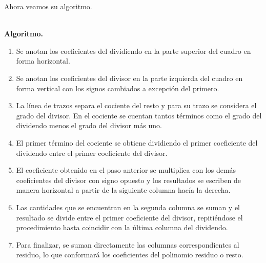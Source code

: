 Ahora veamos su algoritmo.

\vspace{1cm}\\

\textbf{Algoritmo.}
\begin{enumerate}
    \item Se anotan los coeficientes del dividiendo en la parte superior del cuadro en forma horizontal.
    \item Se anotan los coeficientes del divisor en la parte izquierda del cuadro en forma vertical con los signos cambiados a excepción del primero.
    \item La línea de trazos separa el cociente del resto y para su trazo se considera el grado del divisor.
    En el cociente se cuentan tantos términos como el grado del dividendo menos el grado del divisor más uno.
    \item El primer término del cociente se obtiene dividiendo el primer coeficiente del dividendo entre el primer coeficiente del divisor.
    \item El coeficiente obtenido en el paso anterior se multiplica con los demás coeficientes del divisor con signo opuesto y los resultados se escriben de manera horizontal a partir de la siguiente columna hacía la derecha.
    \item Las cantidades que se encuentran en la segunda columna se suman y el resultado se divide entre el primer coeficiente del divisor, repitiéndose el procedimiento hasta coincidir con la última columna del dividendo.
    \item Para finalizar, se suman directamente las columnas correspondientes al residuo, lo que conformará los coeficientes del polinomio residuo o resto.
\end{enumerate}

